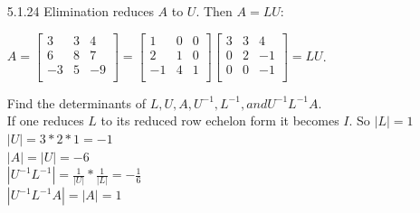 \documentclass[10pt,twoside,reqno]{article}
\begin{document}
\begin{enumerate}
\item[5.1.24] Elimination reduces $A$ to $U$. Then $A = LU$: \\
\begin{center}
$
A=
\begin{bmatrix}
3&3&4\\
6&8&7\\
-3&5&-9\\
\end{bmatrix}
=
\begin{bmatrix}
1&0&0\\
2&1&0\\
-1&4&1\\
\end{bmatrix}
\begin{bmatrix}
3&3&4\\
0&2&-1\\
0&0&-1\\
\end{bmatrix}
=LU
$. \\
\end{center}
Find the determinants of $L,U,A,U^{-1},L^{-1}, and U^{-1}L^{-1}A$. \\
\vspace{2mm}
{\addtolength{\leftskip}{10mm}
If one reduces $L$ to its reduced row echelon form it becomes $I$. So $|L|=1$ \\ \vspace{2mm}
$|U|=3*2*1=-1$ \\ \vspace{2mm}
$|A|=|U|=-6$ \\ \vspace{2mm}
$|U^{-1}L^{-1}|=\frac{1}{|U|}*\frac{1}{|L|}=-\frac{1}{6}$ \\ \vspace{2mm}
$|U^{-1}L^{-1}A|=|A|=1$ \\ \vspace{3mm}
}


\end{enumerate}
\end{document}

